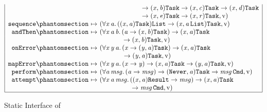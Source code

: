 \begin{figure}[htbp]
\[\begin{array}{|r@{\ }c@{\ }l|}
 & & \phantom{(\forall\mv{x}\,\mv{a}\,\mv{b}\,\mv{c}\,\mv{d}\,\mv{e}\,\mv{r}.\,}{} \rightarrow (\mv{x}, \mv{b})\sbtTask \rightarrow (\mv{x}, \mv{c})\sbtTask \rightarrow (\mv{x}, \mv{d})\sbtTask\\
 & & \phantom{(\forall\mv{x}\,\mv{a}\,\mv{b}\,\mv{c}\,\mv{d}\,\mv{e}\,\mv{r}.\,}{} \rightarrow (\mv{x}, \mv{e})\sbtTask \rightarrow (\mv{x}, \mv{r})\sbtTask, \isv)\\
\kw{sequence}\citelabel{b:Task.sequence} & \mapsto & (\forall\mv{x}\,\mv{a}.\,((\mv{x}, \mv{a})\sbtTask)\tList \rightarrow (\mv{x}, \mv{a}\,\tList)\sbtTask, \isv)\\
\kw{andThen}\citelabel{b:Task.andThen} & \mapsto & (\forall\mv{x}\,\mv{a}\,\mv{b}.\,(\mv{a} \rightarrow (\mv{x}, \mv{b})\sbtTask) \rightarrow (\mv{x}, \mv{a})\sbtTask\\
 & & \phantom{(\forall\mv{x}\,\mv{a}\,\mv{b}.\,}{} \rightarrow (\mv{x}, \mv{b})\sbtTask, \isv)\\
\kw{onError}\citelabel{b:Task.onError} & \mapsto & (\forall\mv{x}\,\mv{y}\,\mv{a}.\,(\mv{x} \rightarrow (\mv{y}, \mv{a})\sbtTask) \rightarrow (\mv{x}, \mv{a})\sbtTask\\
 & & \phantom{(\forall\mv{x}\,\mv{y}\,\mv{a}.\,}{} \rightarrow (\mv{y}, \mv{a})\sbtTask, \isv)\\
\kw{mapError}\citelabel{b:Task.mapError} & \mapsto & (\forall\mv{x}\,\mv{y}\,\mv{a}.\,(\mv{x} \rightarrow \mv{y}) \rightarrow (\mv{x}, \mv{a})\sbtTask \rightarrow (\mv{y}, \mv{a})\sbtTask, \isv)\\
\kw{perform}\citelabel{b:Task.perform} & \mapsto & (\forall\mv{a}\,\mv{msg}.\,(\mv{a} \rightarrow \mv{msg}) \rightarrow (\sbtNever, \mv{a})\sbtTask \rightarrow \mv{msg}\,\sbtCmd, \isv)\\
\kw{attempt}\citelabel{b:Task.attempt} & \mapsto & (\forall\mv{x}\,\mv{a}\,\mv{msg}.\,((\mv{x}, \mv{a})\sbtResult \rightarrow \mv{msg}) \rightarrow (\mv{x}, \mv{a})\sbtTask\\
 & & \phantom{(\forall\mv{x}\,\mv{a}\,\mv{msg}.\,}{} \rightarrow \mv{msg}\,\sbtCmd, \isv)\\
\hline
\end{array}
\]
\caption{Static Interface of }\label{fig:static-basis-task}
\end{figure}

